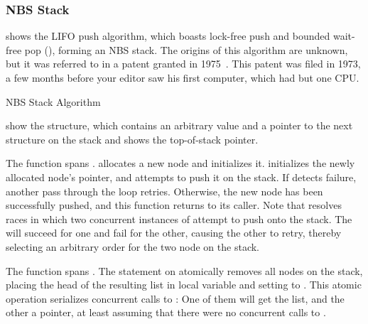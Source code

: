 \subsubsection{NBS Stack}
\label{sec:advsync:NBS Stack}

\begin{fcvref}
shows the LIFO push algorithm, which boasts lock-free push and
bounded wait-free pop (), forming an NBS stack.
The origins of this algorithm are unknown, but it was referred to in
a patent granted in 1975~\cite{PaulJBrown1975LIFOpush}.
This patent was filed in 1973, a few months before your editor
saw his first computer, which had but one CPU\@.

\begin{listing}[tbp]

\caption{NBS Stack Algorithm}
\label{lst:advsync:NBS Stack Algorithm}
\end{listing}

 show the  structure,
which contains an arbitrary value and a pointer to the next structure
on the stack and
 shows the top-of-stack pointer.

The  function spans .
 allocates a new node and
 initializes it.
 initializes the newly allocated node's 
pointer, and  attempts to push it on the stack.
If  detects  failure, another pass
through the loop retries.
Otherwise, the new node has been successfully pushed, and this function
returns to its caller.
Note that  resolves races in which two concurrent
instances of  attempt to push onto the stack.
The  will succeed for one and fail for the other,
causing the other to retry, thereby selecting an arbitrary order for
the two node on the stack.

The  function spans .
The  statement on  atomically removes
all nodes on the stack, placing the head of the resulting list in local
variable  and setting  to .
This atomic operation serializes concurrent calls to :
One of them will get the list, and the other a  pointer, at
least assuming that there were no concurrent calls to .


\end{fcvref}
